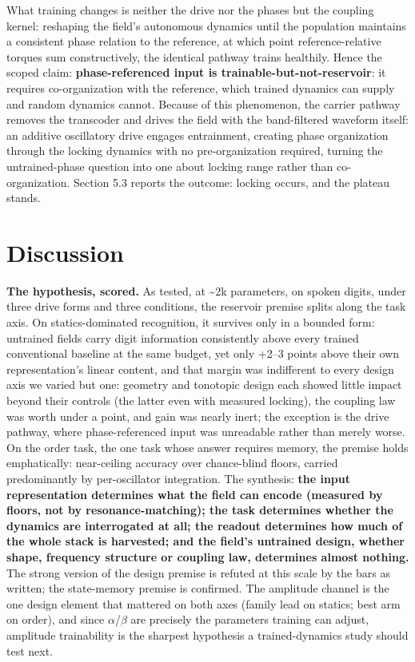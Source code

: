 \documentclass[10pt]{article}
\makeatletter
\newcommand{\tmlr@floatbarrier}{\par\vspace{\z@}%
  \ifx\@deferlist\@empty\else\clearpage\fi}
\let\tmlr@section\section
\renewcommand{\section}{\tmlr@floatbarrier\tmlr@section}
\makeatother
\begin{document}
What training changes is neither the drive nor the phases but the
coupling kernel: reshaping the field's autonomous dynamics until the
population maintains a consistent phase relation to the reference, at
which point reference-relative torques sum constructively, the identical
pathway trains healthily. Hence the scoped claim:
\textbf{phase-referenced input is trainable-but-not-reservoir}: it
requires co-organization with the reference, which trained dynamics can
supply and random dynamics cannot. Because of this phenomenon, the
carrier pathway removes the transcoder and drives the field with the
band-filtered waveform itself: an additive oscillatory drive engages
entrainment, creating phase organization through the locking dynamics
with no pre-organization required, turning the untrained-phase question
into one about locking range rather than co-organization. Section 5.3
reports the outcome: locking occurs, and the plateau stands.

\section{Discussion}\label{discussion}

\textbf{The hypothesis, scored.} As tested, at \textasciitilde2k
parameters, on spoken digits, under three drive forms and three
conditions, the reservoir premise splits along the task axis. On
statics-dominated recognition, it survives only in a bounded form:
untrained fields carry digit information consistently above every
trained conventional baseline at the same budget, yet only +2--3 points
above their own representation's linear content, and that margin was
indifferent to every design axis we varied but one: geometry and
tonotopic design each showed little impact beyond their controls (the
latter even with measured locking), the coupling law was worth under a
point, and gain was nearly inert; the exception is the drive pathway,
where phase-referenced input was unreadable rather than merely worse. On
the order task, the one task whose answer requires memory, the premise
holds emphatically: near-ceiling accuracy over chance-blind floors,
carried predominantly by per-oscillator integration. The synthesis:
\textbf{the input representation determines what the field can encode
(measured by floors, not by resonance-matching); the task determines
whether the dynamics are interrogated at all; the readout determines how
much of the whole stack is harvested; and the field's untrained design,
whether shape, frequency structure or coupling law, determines almost
nothing.} The strong version of the design premise is refuted at this
scale by the bars as written; the state-memory premise is confirmed. The
amplitude channel is the one design element that mattered on both axes
(family lead on statics; best arm on order), and since
\ensuremath{\alpha}/\ensuremath{\beta} are precisely the parameters
training can adjust, amplitude trainability is the sharpest hypothesis a
trained-dynamics study should test next.
\end{document}
